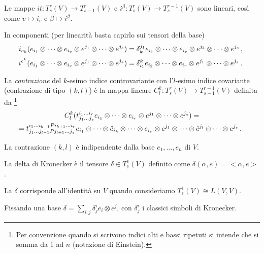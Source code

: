 \begin{remark}
	Le mappe $it:T_s^r(V)\to T_{s-1}^r(V)$ e $i^\beta:T_s^r(V)\to T_s^{r-1}(V)$ sono lineari, così come $v\mapsto i_v$ e $\beta\mapsto i^\beta$.
\end{remark}

In componenti (per linearità basta capirlo sui tensori della base)
\begin{equation*}
	i_{e_k} (e_{i_1}\otimes \dots \otimes e_{i_r}\otimes e^{j_1}\otimes \dots\otimes e^{j_s}) = \delta_k^{j_1} e_{i_1}\otimes \dots \otimes e_{i_r}\otimes e^{j_2}\otimes \dots\otimes e^{j_s}\, \text{, }
\end{equation*}
\begin{equation*}
	i^{e^k} (e_{i_1}\otimes \dots \otimes e_{i_r}\otimes e^{j_1}\otimes \dots\otimes e^{j_s}) = \delta_{i_1}^k e_{i_2}\otimes \dots \otimes e_{i_r}\otimes e^{j_1}\otimes \dots\otimes e^{j_s}\, \text{. }
\end{equation*}

\begin{definition} 
	La \emph{contrazione} del $k$-esimo indice controvariante con l'$l$-esimo indice covariante (contrazione di tipo $(k,l)$) è la mappa lineare $C_l^k:T_s^r(V)\to T_{s-1}^{r-1}(V)$ definita da \footnote{ Per convenzione quando si scrivono indici alti e bassi ripetuti  si intende che si somma da $1$ ad $n$ (notazione di Einstein).}
	\begin{multline*}
		C_l^k(t_{j_1\dots j_s}^{i_1\dots i_r} e_{i_1}\otimes \dots \otimes e_{i_r}\otimes e^{j_1}\otimes \dots\otimes e^{j_s}) =\\
		=t_{j_1\dots j_{l-1}Pj_{l+1}\dots j_s}^{i_1\dots i_{k-1}Pi_{k+1}\dots i_r}e_{i_1}\otimes \dots \otimes\hat e_{i_k}\otimes \dots\otimes e_{i_r}\otimes e^{j_1}\otimes \dots\otimes \hat e^{j_l}\otimes \dots \otimes e^{j_s}\, \text{. }
	\end{multline*}
\end{definition}

\begin{remark}
	La contrazione $(k,l)$ è indipendente dalla base $e_1,\dots,e_n$ di $V$.
\end{remark}

\begin{definition}
	La delta di Kronecker è il tensore $\delta \in T_1^1(V)$ definito come $\delta(\alpha,e) = <\alpha,e>$.
\end{definition}

\begin{remark}
	La $\delta$ corrisponde all'identità su $V$ quando consideriamo $T_1^1(V) \cong L(V,V)$.
	
	Fissando una base $\delta = \sum_{i,j}\delta_j^i e_i\otimes e^j$, con $\delta_j^i$ i classici simboli di Kronecker.
\end{remark}

